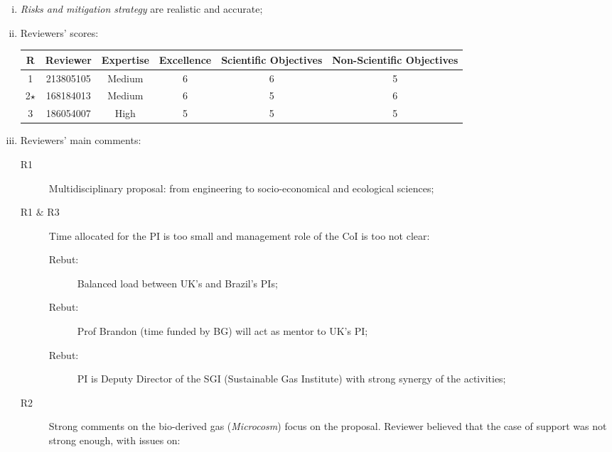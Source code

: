 \documentclass[14pt,twoside]{report}
\begin{document}
\begin{enumerate}[(i)]
\begin{description}
      \end{description}
%
   \item {\it Risks and mitigation strategy} are realistic and accurate;
%
   \item Reviewers' scores:
       \begin{center}
          \begin{tabular}{c c | c c c c }
              \hline
               {\bf R} & {\bf Reviewer} & {\bf Expertise} & {\bf Excellence}  & {\bf Scientific Objectives} & {\bf Non-Scientific Objectives} \\ 
              \hline
                 1     &  213805105    &  Medium         &      6            &          6                  &         5                       \\
             2$\star$  &  168184013    &  Medium         &      6            &          5                  &         6                       \\
                 3     &  186054007    &  High           &      5            &          5                  &         5                       \\
              \hline
          \end{tabular}
       \end{center}
%
   \item Reviewers' main comments:
       \begin{description}
%
          \item[R1] Multidisciplinary proposal: from engineering to socio-economical and ecological sciences;
          \item[R1 $\&$ R3] Time allocated for the PI is too small and management role of the CoI is too not clear:
            \begin{description}
               \item[Rebut:] Balanced load between UK's and Brazil's PIs;
               \item[Rebut:] Prof Brandon (time funded by BG) will act as mentor to UK's PI;
               \item[Rebut:] PI is Deputy Director of the SGI (Sustainable Gas Institute) with strong synergy of the activities;
            \end{description}
          \item[R2] Strong comments on the bio-derived gas ({\it Microcosm}) focus on the proposal. Reviewer believed that the case of support was not strong enough, with issues on:
            \begin{enumerate}

\end{enumerate}
\end{description}
\end{enumerate}
\end{document}
